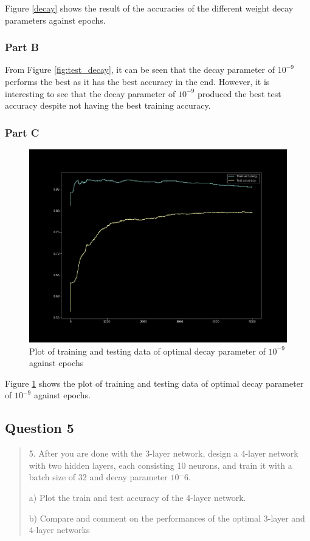 Figure \ref{decay} shows the result of the accuracies of the different weight decay parameters against epochs.

\subsubsection{Part B}

From Figure \ref{fig:test_decay}, it can be seen that the decay parameter of $10^{-9}$ performs the best as it has the best accuracy in the end. However, it is interesting to see that the decay parameter of $10^{-9}$ produced the best test accuracy despite not having the best training accuracy.

\subsubsection{Part C}
\begin{figure}[H]
    \centering
    \includegraphics[width=0.8\linewidth]{assets/plots/part1_Q3c.png}
    \caption{Plot of training and testing data of optimal decay parameter of $10^{-9}$ against epochs}
    \label{fig:4c}
\end{figure}

Figure \ref{fig:4c} shows the plot of training and testing data of optimal decay parameter of $10^{-9}$ against epochs.

\subsection{Question 5}
\label{1q5}
\begin{quote}
5. After you are done with the 3-layer network, design a 4-layer network with two hidden layers, each consisting 10 neurons, and train it with a batch size of 32 and decay parameter $10^-6$.

a) Plot the train and test accuracy of the 4-layer network.

b) Compare and comment on the performances of the optimal 3-layer and 4-layer
networks
\end{quote}

